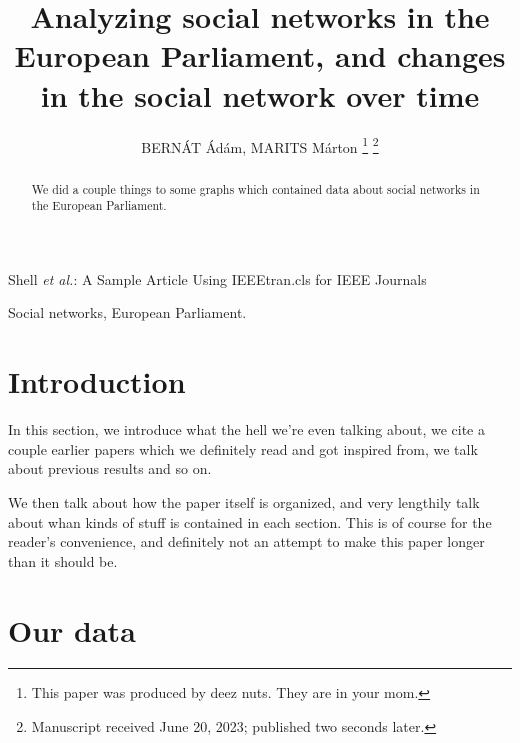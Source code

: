 \documentclass[lettersize,journal]{IEEEtran}
\begin{document}
\title{Analyzing social networks in the European Parliament, and changes in the social network over time}

\author{{BERNÁT Ádám, MARITS Márton}
\thanks{This paper was produced by deez nuts. They are in your mom.}%
\thanks{Manuscript received June 20, 2023; published two seconds later.}}

%
{Shell \MakeLowercase{\textit{et al.}}: A Sample Article Using IEEEtran.cls for IEEE Journals}


\maketitle

\begin{abstract}
We did a couple things to some graphs which contained data about social networks in the European Parliament.
\end{abstract}

\begin{IEEEkeywords}
Social networks, European Parliament.
\end{IEEEkeywords}

\section{Introduction}


In this section, we introduce what the hell we're even talking about, we cite a couple earlier papers which we definitely read and got inspired from, we talk about previous results and so on.

We then talk about how the paper itself is organized, and very lengthily talk about whan kinds of stuff is contained in each section. This is of course for the reader's convenience, and definitely not an attempt to make this paper longer than it should be.

\section{Our data}
\end{document}
